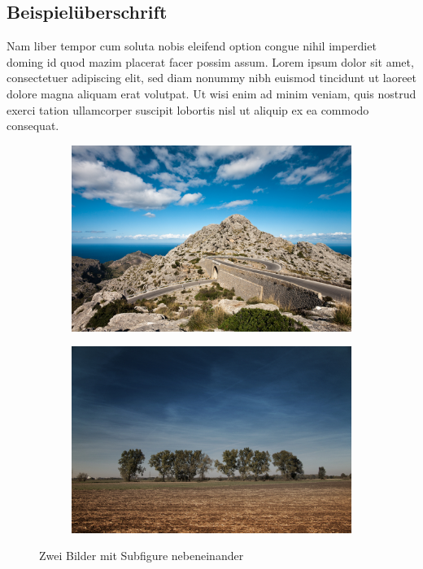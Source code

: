 	\subsection{Beispielüberschrift}
	Nam liber tempor cum soluta nobis eleifend option congue nihil imperdiet doming id quod mazim placerat facer possim assum. Lorem ipsum dolor sit amet, consectetuer adipiscing elit, sed diam nonummy nibh euismod tincidunt ut laoreet dolore magna aliquam erat volutpat. Ut wisi enim ad minim veniam, quis nostrud exerci tation ullamcorper suscipit lobortis nisl ut aliquip ex ea commodo consequat. 
	
	\begin{figure}
		\begin{subfigure}[c]{0.49\textwidth}
			\includegraphics[width=\textwidth]{images/b1.jpg}
		\end{subfigure}
		\begin{subfigure}[c]{0.49\textwidth}
			\includegraphics[width=\textwidth]{images/b2.jpg}
		\end{subfigure}
		\caption{Zwei Bilder mit Subfigure nebeneinander}
	\end{figure}
	
